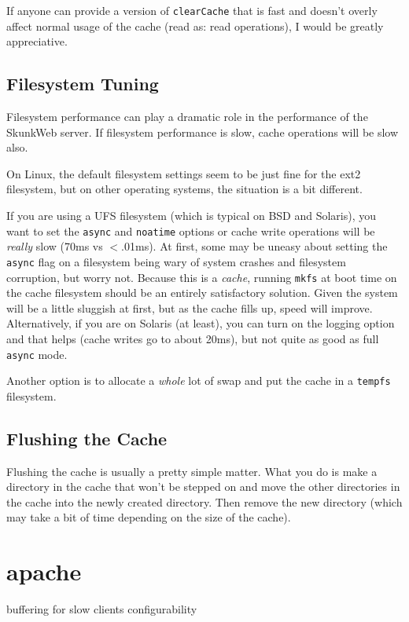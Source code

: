 \documentclass[titlepage]{manual}
\begin{document}
If anyone can provide a version of \texttt{clearCache} that is fast
and doesn't overly affect normal usage of the cache (read as: read
operations), I would be greatly appreciative.

\subsection{Filesystem Tuning}
Filesystem performance can play a dramatic role in the performance of
the SkunkWeb server.  If filesystem performance is slow, cache operations
will be slow also.

On Linux, the default filesystem settings seem to be just fine for the
ext2 filesystem, but on other operating systems, the situation is a
bit different.

If you are using a UFS filesystem (which is typical on BSD and Solaris),
you want to set the \texttt{async} and \texttt{noatime} options or cache
write operations will be \emph{really} slow (70ms vs $<$.01ms).  At first,
some may be uneasy about setting the \texttt{async} flag on a filesystem
being wary of system crashes and filesystem corruption, but worry not.
Because this is a \emph{cache}, running \texttt{mkfs} at boot time on the
cache filesystem should be an entirely satisfactory solution.  Given the
system will be a little sluggish at first, but as the cache fills up, speed
will improve.  Alternatively, if you are on Solaris (at least), you can 
turn on the logging option and that helps (cache writes go to about 20ms),
but not quite as good as full \texttt{async} mode.

Another option is to allocate a \emph{whole} lot of swap and put the
cache in a \texttt{tempfs} filesystem.
 
\subsection{Flushing the Cache}
Flushing the cache is usually a pretty simple matter.  What you do is
make a directory in the cache that won't be stepped on and move the
other directories in the cache into the newly created directory.  Then
remove the new directory (which may take a bit of time depending on
the size of the cache).

\section{apache}
    buffering for slow clients
    configurability
\end{document}
